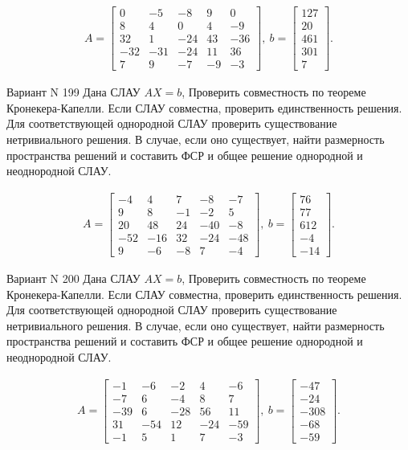 \documentclass[11pt]{report}
\begin{document}
\begin{align*}
 A = \left[\begin{matrix}0 & -5 & -8 & 9 & 0\\8 & 4 & 0 & 4 & -9\\32 & 1 & -24 & 43 & -36\\-32 & -31 & -24 & 11 & 36\\7 & 9 & -7 & -9 & -3\end{matrix}\right],
\ b = \left[\begin{matrix}127\\20\\461\\301\\7\end{matrix}\right]. 
 \end{align*}

Вариант N 199
Дана СЛАУ $AX = b$,
Проверить совместность по теореме Кронекера-Капелли. Если СЛАУ совместна, проверить единственность решения.
Для соответствующей однородной СЛАУ проверить существование нетривиального решения. В случае, если оно существует,
найти размерность пространства решений и составить ФСР и общее решение однородной  и неоднородной СЛАУ.


\begin{align*}
 A = \left[\begin{matrix}-4 & 4 & 7 & -8 & -7\\9 & 8 & -1 & -2 & 5\\20 & 48 & 24 & -40 & -8\\-52 & -16 & 32 & -24 & -48\\9 & -6 & -8 & 7 & -4\end{matrix}\right],
\ b = \left[\begin{matrix}76\\77\\612\\-4\\-14\end{matrix}\right]. 
 \end{align*}

Вариант N 200
Дана СЛАУ $AX = b$,
Проверить совместность по теореме Кронекера-Капелли. Если СЛАУ совместна, проверить единственность решения.
Для соответствующей однородной СЛАУ проверить существование нетривиального решения. В случае, если оно существует,
найти размерность пространства решений и составить ФСР и общее решение однородной  и неоднородной СЛАУ.


\begin{align*}
 A = \left[\begin{matrix}-1 & -6 & -2 & 4 & -6\\-7 & 6 & -4 & 8 & 7\\-39 & 6 & -28 & 56 & 11\\31 & -54 & 12 & -24 & -59\\-1 & 5 & 1 & 7 & -3\end{matrix}\right],
\ b = \left[\begin{matrix}-47\\-24\\-308\\-68\\-59\end{matrix}\right]. 
 \end{align*}
\end{document}
